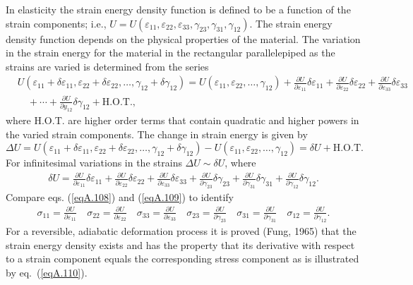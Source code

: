 \documentclass{AeroStructure-ERJohnson}
\begin{document}
In elasticity the strain energy density function is defined to be a function of the strain components; i.e., $U=U(\varepsilon_{11}, \varepsilon_{22}, \varepsilon_{33}, \gamma_{23}, \gamma_{31}, \gamma_{12})$. The strain energy density function depends on the physical properties of the material. The variation in the strain energy for the material in the rectangular parallelepiped as the strains are varied is determined from the series
\begin{align*}
&U\!\left(\varepsilon_{11}+\delta \varepsilon_{11}, \varepsilon_{22}+\delta \varepsilon_{22}, \ldots, \gamma_{12}+\delta \gamma_{12}\right)
=U\!\left(\varepsilon_{11}, \varepsilon_{22}, \ldots, \gamma_{12}\right)+\frac{\partial U}{\partial \varepsilon_{11}} \delta \varepsilon_{11}+\frac{\partial U}{\partial \varepsilon_{22}} \delta \varepsilon_{22}+\frac{\partial U}{\partial \varepsilon_{33}} \delta \varepsilon_{33}\\
&\quad+\cdots+\frac{\partial U}{\partial y_{12}} \delta \gamma_{12} + \text{H.O.T.},
\end{align*}
where H.O.T. are higher order terms that contain quadratic and higher powers in the varied strain components. The change in strain energy is given by
\[
\Delta U=U(\varepsilon_{11}+\delta \varepsilon_{11}, \varepsilon_{22}+\delta \varepsilon_{22}, \ldots, \gamma_{12}+\delta \gamma_{12})-U(\varepsilon_{11}, \varepsilon_{22}, \ldots, \gamma_{12})=\delta U+ \text{H.O.T.}
\]
For infinitesimal variations in the strains $\Delta U \sim \delta U$, where
\begin{align}\label{eqA.109}
\delta U=\frac{\partial U}{\partial \varepsilon_{11}} \delta \varepsilon_{11}+\frac{\partial U}{\partial \varepsilon_{22}} \delta \varepsilon_{22}+\frac{\partial U}{\partial \varepsilon_{33}} \delta \varepsilon_{33}+\frac{\partial U}{\partial \gamma_{23}} \delta \gamma_{23}+\frac{\partial U}{\partial \gamma_{31}} \delta \gamma_{31}+\frac{\partial U}{\partial \gamma_{12}} \delta \gamma_{12}.
\end{align}
Compare eqs. (\ref{eqA.108}) and (\ref{eqA.109}) to identify
\begin{align}\label{eqA.110}
\sigma_{11}=\frac{\partial U}{\partial \varepsilon_{11}} \quad \sigma_{22}=\frac{\partial U}{\partial \varepsilon_{22}} \quad \sigma_{33}=\frac{\partial U}{\partial \varepsilon_{33}} \quad \sigma_{23}=\frac{\partial U}{\partial \gamma_{23}} \quad \sigma_{31}=\frac{\partial U}{\partial \gamma_{31}} \quad \sigma_{12}=\frac{\partial U}{\partial \gamma_{12}}.
\end{align}
For a reversible, adiabatic deformation process it is proved (Fung, 1965) that the strain energy density exists and has the property that its derivative with respect to a strain component equals the corresponding stress component as is illustrated by eq.~(\ref{eqA.110}).
\end{document}
